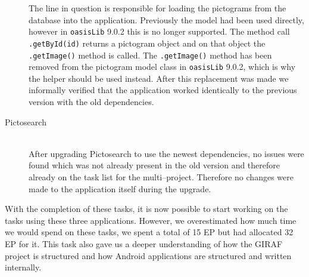 \begin{description}
    The line in question is responsible for loading the pictograms from the database into the application.
    Previously the model had been used directly, however in \texttt{oasisLib} 9.0.2 this is no longer supported.
    The method call \texttt{.getById(id)} returns a pictogram object and on that object the \texttt{.getImage()} method is called.
    The \texttt{.getImage()} method has been removed from the pictogram model class in \texttt{oasisLib} 9.0.2, which is why the helper should be used instead.
    After this replacement was made we informally verified that the application worked identically to the previous version with the old dependencies.

    \item[Pictosearch] \hfill \\
    After upgrading Pictosearch to use the newest dependencies, no issues were found which was not already present in the old version and therefore already on the task list for the multi--project.
    Therefore no changes were made to the application itself during the upgrade.
\end{description}

 With the completion of these tasks, it is now possible to start working on the tasks using these three applications.
 However, we overestimated how much time we would spend on these tasks, we spent a total of 15 EP but had allocated 32 EP for it.
 This task also gave us a deeper understanding of how the GIRAF project is structured and how Android applications are structured and written internally.
